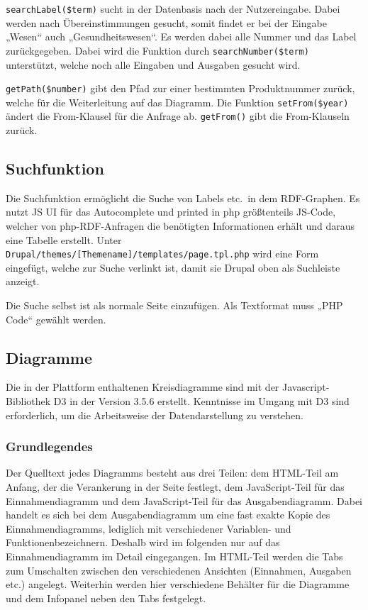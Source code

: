 \documentclass[a4paper,11pt,twoside]{article}
\begin{document}
\texttt{searchLabel(\$term)} sucht in der Datenbasis nach der Nutzereingabe.
Dabei werden nach Übereinstimmungen gesucht, somit findet er bei der Eingabe
„Wesen“ auch „Gesundheitswesen“. Es werden dabei alle Nummer und das Label
zurückgegeben. Dabei wird die Funktion durch \texttt{searchNumber(\$term)}
unterstützt, welche noch alle Eingaben und Ausgaben gesucht wird.

\texttt{getPath(\$number)} gibt den Pfad zur einer bestimmten Produktnummer
zurück, welche für die Weiterleitung auf das Diagramm.  Die Funktion
\texttt{setFrom(\$year)} ändert die From-Klausel für die Anfrage ab.
\texttt{getFrom()} gibt die From-Klauseln zurück.

\subsection{Suchfunktion}
Die Suchfunktion ermöglicht die Suche von Labels etc.\ in dem RDF-Graphen.  Es
nutzt JS UI für das Autocomplete und printed in php größtenteils JS-Code,
welcher von php-RDF-Anfragen die benötigten Informationen erhält und daraus
eine Tabelle erstellt.  Unter
\texttt{Drupal/themes/[Themename]/templates/page.tpl.php} wird eine Form
eingefügt, welche zur Suche verlinkt ist, damit sie Drupal oben als Suchleiste
anzeigt.

Die Suche selbst ist als normale Seite einzufügen. Als Textformat muss „PHP
Code“ gewählt werden.

\subsection{Diagramme}

Die in der Plattform enthaltenen Kreisdiagramme sind mit der
Javascript-Bibliothek D3 in der Version 3.5.6 \cite{D3} erstellt.  Kenntnisse
im Umgang mit D3 sind erforderlich, um die Arbeitsweise der Datendarstellung
zu verstehen.

\subsubsection{Grundlegendes}

Der Quelltext jedes Diagramms besteht aus drei Teilen: dem HTML-Teil am
Anfang, der die Verankerung in der Seite festlegt, dem JavaScript-Teil für das
Einnahmendiagramm und dem JavaScript-Teil für das Ausgabendiagramm. Dabei
handelt es sich bei dem Ausgabendiagramm um eine fast exakte Kopie des
Einnahmendiagramms, lediglich mit verschiedener Variablen- und
Funktionenbezeichnern.  Deshalb wird im folgenden nur auf das
Einnahmendiagramm im Detail eingegangen. Im HTML-Teil werden die Tabs zum
Umschalten zwischen den verschiedenen Ansichten (Einnahmen, Ausgaben etc.)
angelegt. Weiterhin werden hier verschiedene Behälter für die Diagramme und
dem Infopanel neben den Tabs festgelegt.
\end{document}
